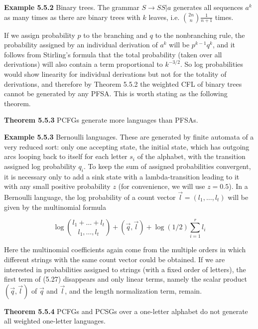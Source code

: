 \smallskip
\noindent
{\bf Example 5.5.2} Binary trees. The grammar $S \rightarrow SS|a$ generates
all sequences $a^k$ as many times as there are binary trees with $k$ leaves,
i.e. ${{2n}\choose{n}} \frac{1}{n+1}$ times. 

\smallskip\noindent
If we assign probability $p$ to the branching and $q$ to the nonbranching
rule, the probability assigned by an individual derivation of $a^k$ will be
$p^{k-1}q^k$, and it follows from Stirling's formula that the total
probability (taken over all derivations) will also contain a term proportional
to $k^{-3/2}$. So log probabilities would show linearity for individual
derivations but not for the totality of derivations, and therefore by Theorem
5.5.2 the weighted CFL of binary trees cannot be generated by any PFSA. 
 This is worth stating as the following theorem.

\smallskip
\noindent
{\bf Theorem 5.5.3} PCFGs generate more languages than PFSAs.

\smallskip
\noindent
{\bf Example 5.5.3} Bernoulli languages. These are generated by finite
automata of a very reduced sort: only one accepting state, the initial state,
which has outgoing arcs looping back to itself for each letter $s_i$ of the
alphabet, with the transition assigned log probability $q_i$. To keep the sum
of assigned probabilities convergent, it is necessary only to add a sink state
with a lambda-transition leading to it with any small positive probability $z$
(for convenience, we will use $z=0.5$). In a Bernoulli language, the log
probability of a count vector $\vec{l}=(l_1, \ldots, l_t)$ will be given by the
multinomial formula

\begin{equation}
\log {{l_1+\ldots +l_t}\choose{l_1,\ldots ,l_t}} +(\vec{q},\vec{l})
+\log(1/2)\sum_{i=1}^r l_i
\end{equation}

\noindent
Here the multinomial coefficients again come from the multiple orders in which
different strings with the same count vector could be obtained. If we are
interested in probabilities assigned to strings (with a fixed order of
letters), the first term of (5.27) disappears and only linear terms, namely the
scalar product $(\vec{q},\vec{l})$ of $\vec{q}$ and $\vec{l}$, and the length
normalization term, remain.

\smallskip
\noindent
{\bf Theorem 5.5.4} PCFGs and PCSGs over a one-letter alphabet do not generate
all weighted one-letter languages. 

